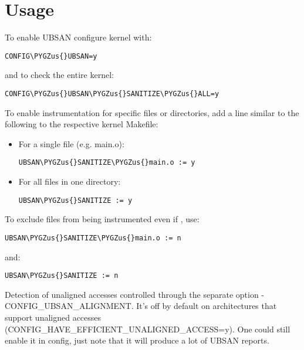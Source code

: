 \documentclass[a4paper,8pt,english]{sphinxmanual}
\def\PYGZus{\char`\_}
\begin{document}
\section{Usage}
\label{dev-tools/ubsan:usage}
To enable UBSAN configure kernel with:

\begin{Verbatim}[commandchars=\\\{\}]
CONFIG\PYGZus{}UBSAN=y
\end{Verbatim}

and to check the entire kernel:

\begin{Verbatim}[commandchars=\\\{\}]
CONFIG\PYGZus{}UBSAN\PYGZus{}SANITIZE\PYGZus{}ALL=y
\end{Verbatim}

To enable instrumentation for specific files or directories, add a line
similar to the following to the respective kernel Makefile:
\begin{itemize}
\item {} 
For a single file (e.g. main.o):

\begin{Verbatim}[commandchars=\\\{\}]
UBSAN\PYGZus{}SANITIZE\PYGZus{}main.o := y
\end{Verbatim}

\item {} 
For all files in one directory:

\begin{Verbatim}[commandchars=\\\{\}]
UBSAN\PYGZus{}SANITIZE := y
\end{Verbatim}

\end{itemize}

To exclude files from being instrumented even if
, use:

\begin{Verbatim}[commandchars=\\\{\}]
UBSAN\PYGZus{}SANITIZE\PYGZus{}main.o := n
\end{Verbatim}

and:

\begin{Verbatim}[commandchars=\\\{\}]
UBSAN\PYGZus{}SANITIZE := n
\end{Verbatim}

Detection of unaligned accesses controlled through the separate option -
CONFIG\_UBSAN\_ALIGNMENT. It's off by default on architectures that support
unaligned accesses (CONFIG\_HAVE\_EFFICIENT\_UNALIGNED\_ACCESS=y). One could
still enable it in config, just note that it will produce a lot of UBSAN
reports.
\end{document}

